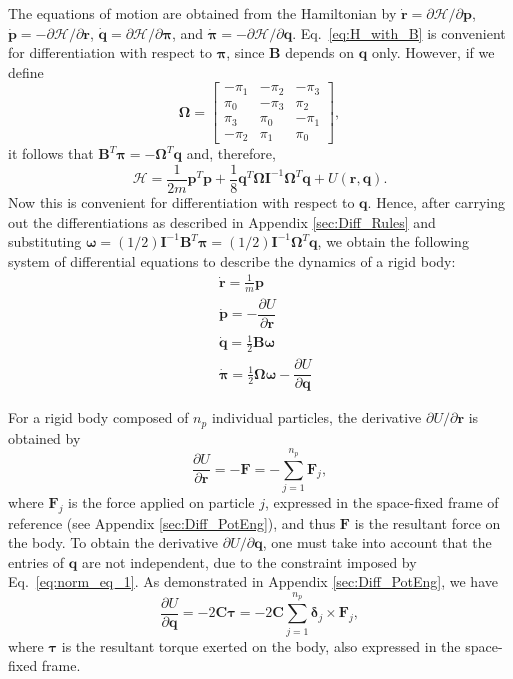 \documentclass[aip,jcp,reprint,amsmath,amssymb]{revtex4-1}
\newcommand{\mt}[1]{\boldsymbol{\mathbf{#1}}}           %
\newcommand{\vt}[1]{\boldsymbol{\mathbf{#1}}}           %
\newcommand{\tr}[1]{#1^T}                               %
\newcommand{\diff}[2]{\dfrac{\partial #1}{\partial #2}} %
\begin{document}
The equations of motion are obtained from the Hamiltonian by $\dot{\vt r} = \partial \mathcal{H} / \partial \vt p$, $\dot{\vt p} = -\partial \mathcal{H} / \partial \vt r$, $\dot{\vt q} = \partial \mathcal{H} / \partial \vt \pi$, and $\dot{\vt \pi} = -\partial \mathcal{H} / \partial \vt q$.\cite{Goldstein2002} Eq.~\ref{eq:H_with_B} is convenient for differentiation with respect to $\vt \pi$, since $\mt B$ depends on $\vt q$ only. However, if we define
\[
\mt \Omega = \left[
\begin{array}{rrrr}
-\pi_1 & -\pi_2 & -\pi_3 \\
 \pi_0 & -\pi_3 &  \pi_2 \\
 \pi_3 &  \pi_0 & -\pi_1 \\
-\pi_2 &  \pi_1 &  \pi_0
\end{array}
\right],
\]
it follows that $\tr{\mt B}{\vt \pi} = -\tr{\mt \Omega}{\vt q}$ and, therefore,
\begin{equation}
\label{eq:H_with_Omega}
\mathcal{H} = \frac{1}{2m} \tr{\vt p} \vt p + \frac{1}{8} \tr{\vt q} {\mt \Omega} {\mt I}^{-1} \tr{\mt \Omega} \vt q + U(\vt r, \vt q).
\end{equation}
Now this is convenient for differentiation with respect to $\vt q$.  Hence, after carrying out the differentiations as described in Appendix \ref{sec:Diff_Rules} and substituting $\vt \omega = (1/2) {\mt I}^{-1} \tr{\mt B} \vt \pi = (1/2) {\mt I}^{-1} \tr{\mt \Omega} \vt q$, we obtain the following system of differential equations to describe the dynamics of a rigid body:
\begin{subequations}
\label{eq:EDO_system}
\begin{align}
&\dot{\vt r} = \frac{1}{m} \vt p \\
&\dot{\vt p} = -\diff{U}{\vt r} \\
&\dot{\vt q} = \frac{1}{2} \mt B \vt \omega \\
&\dot{\vt \pi} = \frac{1}{2} \mt \Omega \vt \omega - \diff{U}{\vt q}
\end{align}
\end{subequations}

For a rigid body composed of $n_p$ individual particles, the derivative $\partial U/\partial \vt r$ is obtained by
\[
\diff{U}{\vt r} = -\vt F = -\sum_{j=1}^{n_p} {\vt F_j},
\]
where $\vt F_j$ is the force applied on particle $j$, expressed in the space-fixed frame of reference (see Appendix \ref{sec:Diff_PotEng}), and thus $\vt F$ is the resultant force on the body. To obtain the derivative $\partial U/\partial \vt q$, one must take into account that the entries of $\vt q$ are not independent, due to the constraint imposed by Eq.~\ref{eq:norm_eq_1}. As demonstrated in Appendix \ref{sec:Diff_PotEng}, we have
\[
\diff{U}{\vt q} = -2 \mt C \vt \tau = -2 \mt C \sum_{j=1}^{n_p} {\vt \delta_j} \times {\vt F_j},
\]
where $\vt \tau$ is the resultant torque exerted on the body, also expressed in the space-fixed frame.
\end{document}
